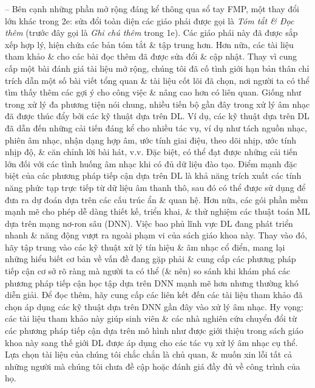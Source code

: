 \documentclass{article}
\begin{document}
\begin{itemize}
	-- Bên cạnh những phần mở rộng đáng kể thông qua sổ tay FMP, một thay đổi lớn khác trong 2e: sửa đổi toàn diện các giáo phái được gọi là {\it Tóm tắt \& Đọc thêm} (trước đây gọi là {\it Ghi chú thêm} trong 1e). Các giáo phái này đã được sắp xếp hợp lý, hiện chứa các bản tóm tắt \& tập trung hơn. Hơn nữa, các tài liệu tham khảo \& cho các bài đọc thêm đã được sửa đổi \& cập nhật. Thay vì cung cấp một bài đánh giá tài liệu mở rộng, chúng tôi đã cố tình giới hạn bản thân chỉ trích dẫn một số bài viết tổng quan \& tài liệu cốt lõi đã chọn, nơi người ta có thể tìm thấy thêm các gợi ý cho công việc \& nâng cao hơn có liên quan. Giống như trong xử lý đa phương tiện nói chung, nhiều tiến bộ gần đây trong xử lý âm nhạc đã được thúc đẩy bởi các kỹ thuật dựa trên DL. Ví dụ, các kỹ thuật dựa trên DL đã dẫn đến những cải tiến đáng kể cho nhiều tác vụ, ví dụ như tách nguồn nhạc, phiên âm nhạc, nhận dạng hợp âm, ước tính giai điệu, theo dõi nhịp, ước tính nhịp độ, \& căn chỉnh lời bài hát, v.v. Đặc biệt, có thể đạt được những cải tiến lớn đối với các tình huống âm nhạc khi có đủ dữ liệu đào tạo. Điểm mạnh đặc biệt của các phương pháp tiếp cận dựa trên DL là khả năng trích xuất các tính năng phức tạp trực tiếp từ dữ liệu âm thanh thô, sau đó có thể được sử dụng để đưa ra dự đoán dựa trên các cấu trúc ẩn \& quan hệ. Hơn nữa, các gói phần mềm mạnh mẽ cho phép dễ dàng thiết kế, triển khai, \& thử nghiệm các thuật toán ML dựa trên mạng nơ-ron sâu (DNN). Việc bao phủ lĩnh vực DL đang phát triển nhanh \& năng động vượt ra ngoài phạm vi của sách giáo khoa này. Thay vào đó, hãy tập trung vào các kỹ thuật xử lý tín hiệu \& âm nhạc cổ điển, mang lại những hiểu biết cơ bản về vấn đề đang gặp phải \& cung cấp các phương pháp tiếp cận cơ sở rõ ràng mà người ta có thể (\& nên) so sánh khi khám phá các phương pháp tiếp cận học tập dựa trên DNN mạnh mẽ hơn nhưng thường khó diễn giải. Để đọc thêm, hãy cung cấp các liên kết đến các tài liệu tham khảo đã chọn áp dụng các kỹ thuật dựa trên DNN gần đây vào xử lý âm nhạc. Hy vọng: các tài liệu tham khảo này giúp sinh viên \& các nhà nghiên cứu chuyển đổi từ các phương pháp tiếp cận dựa trên mô hình như được giới thiệu trong sách giáo khoa này sang thế giới DL được áp dụng cho các tác vụ xử lý âm nhạc cụ thể. Lựa chọn tài liệu của chúng tôi chắc chắn là chủ quan, \& muốn xin lỗi tất cả những người mà chúng tôi chưa đề cập hoặc đánh giá đầy đủ về công trình của họ.

\end{itemize}
\end{document}
